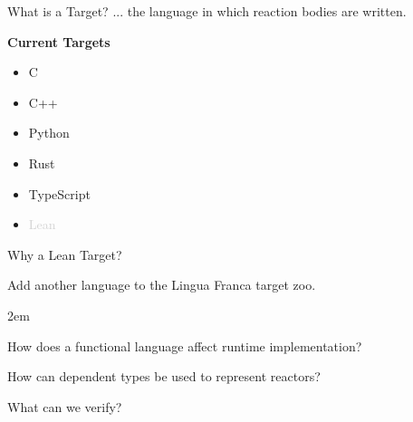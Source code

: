 \documentclass[aspectratio=169]{beamer}
\begin{document}

\begin{frame}[t]{What is a Target?}
... the language in which reaction bodies are written.

\pause

\vspace{5mm}

\textbf{Current Targets}

\vspace{-1.5mm}

\begin{itemize}
  \item C
  \item C++
  \item Python
  \item Rust
  \item TypeScript
  \item \textcolor{lightgray}{Lean}
\end{itemize}
\end{frame}


\begin{frame}{Why a Lean Target?}
\begin{enumerate}
\item Add another language to the Lingua Franca target zoo.
{
\itemsep2em 
\item How does a functional language affect runtime implementation?
\item How can dependent types be used to represent reactors?
\item What can we verify?
}
\end{enumerate}
\end{frame}

\end{document}
